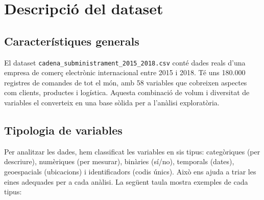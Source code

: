 \documentclass[12pt,a4paper]{article}
\begin{document}
\section{Descripció del dataset}

\subsection{Característiques generals}
El dataset \texttt{cadena\_subministrament\_2015\_2018.csv} conté dades reals d'una empresa de comerç electrònic internacional entre 2015 i 2018. Té uns 180.000 registres de comandes de tot el món, amb 58 variables que cobreixen aspectes com clients, productes i logística. Aquesta combinació de volum i diversitat de variables el converteix en una base sòlida per a l'anàlisi exploratòria.

\subsection{Tipologia de variables}
Per analitzar les dades, hem classificat les variables en sis tipus: categòriques (per descriure), numèriques (per mesurar), binàries (sí/no), temporals (dates), geoespacials (ubicacions) i identificadors (codis únics). Això ens ajuda a triar les eines adequades per a cada anàlisi. La següent taula mostra exemples de cada tipus:
\end{document}

